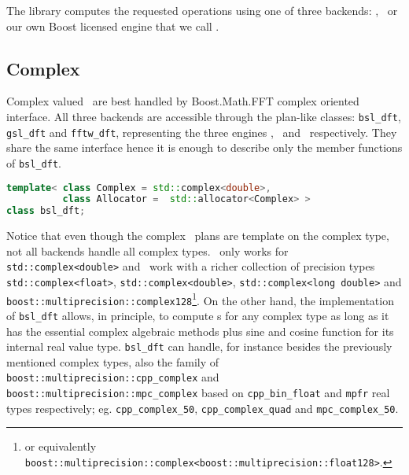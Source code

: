 The library computes the requested operations using one of three backends:
\gsl, \fftw\ or our own Boost licensed engine that we call \bsl. 

\subsection{Complex \dft}
Complex valued \dft\ are best handled by Boost.Math.FFT complex oriented
interface. All three backends are accessible through the plan-like classes:
\verb|bsl_dft|, \verb|gsl_dft| and \verb|fftw_dft|, representing the three
engines \bsl, \gsl\ and \fftw\ respectively. They share the same interface hence
it is enough to describe only the member functions of \verb|bsl_dft|.
\begin{lstlisting}[language=C++,caption=Complex plan declaration.]
template< class Complex = std::complex<double>, 
          class Allocator =  std::allocator<Complex> >
class bsl_dft;
\end{lstlisting}

Notice that even though the complex \dft\ plans are template on the complex
type, not all backends handle all complex types. \gsl\ only works for
\verb|std::complex<double>| and \fftw\ work with a richer collection of
precision types
\verb|std::complex<float>|, \verb|std::complex<double>|, 
\verb|std::complex<long double>| and
\verb|boost::multiprecision::complex128|\footnote{or equivalently
\texttt{boost::multiprecision::complex<boost::multiprecision::float128>}.}.
On the other hand, the implementation of \verb|bsl_dft| allows, in principle, to
compute \dft s
for any complex type as long as it has the essential complex
algebraic methods plus sine and cosine function for its internal real value type.
\verb|bsl_dft| can handle, for instance besides the previously mentioned complex types,
also the family of \verb|boost::multiprecision::cpp_complex|
and \verb|boost::multiprecision::mpc_complex| based on \verb|cpp_bin_float| and
\verb|mpfr| real types respectively; eg.
\verb|cpp_complex_50|, 
\verb|cpp_complex_quad| and 
\verb|mpc_complex_50|.

